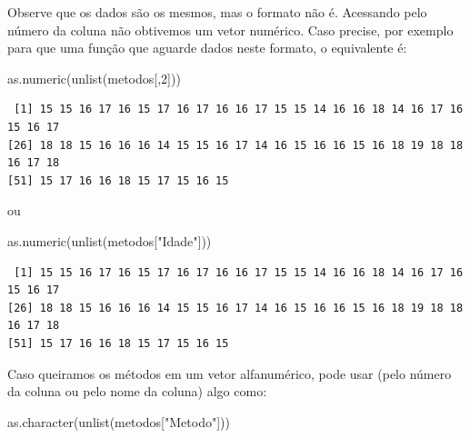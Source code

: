 \documentclass[
]{article}
\newenvironment{Shaded}{\begin{snugshade}}{\end{snugshade}}
\newcommand{\DecValTok}[1]{\textcolor[rgb]{0.00,0.00,0.81}{#1}}
\newcommand{\FunctionTok}[1]{\textcolor[rgb]{0.00,0.00,0.00}{#1}}
\newcommand{\NormalTok}[1]{#1}
\newcommand{\StringTok}[1]{\textcolor[rgb]{0.31,0.60,0.02}{#1}}
\begin{document}
Observe que os dados são os mesmos, mas o formato não é. Acessando pelo
número da coluna não obtivemos um vetor numérico. Caso precise, por
exemplo para que uma função que aguarde dados neste formato, o
equivalente é:

\begin{Shaded}
\begin{Highlighting}[]
\FunctionTok{as.numeric}\NormalTok{(}\FunctionTok{unlist}\NormalTok{(metodos[,}\DecValTok{2}\NormalTok{]))}
\end{Highlighting}
\end{Shaded}

\begin{verbatim}
 [1] 15 15 16 17 16 15 17 16 17 16 16 17 15 15 14 16 16 18 14 16 17 16 15 16 17
[26] 18 18 15 16 16 16 14 15 15 16 17 14 16 15 16 16 15 16 18 19 18 18 16 17 18
[51] 15 17 16 16 18 15 17 15 16 15
\end{verbatim}

ou

\begin{Shaded}
\begin{Highlighting}[]
\FunctionTok{as.numeric}\NormalTok{(}\FunctionTok{unlist}\NormalTok{(metodos[}\StringTok{"Idade"}\NormalTok{]))}
\end{Highlighting}
\end{Shaded}

\begin{verbatim}
 [1] 15 15 16 17 16 15 17 16 17 16 16 17 15 15 14 16 16 18 14 16 17 16 15 16 17
[26] 18 18 15 16 16 16 14 15 15 16 17 14 16 15 16 16 15 16 18 19 18 18 16 17 18
[51] 15 17 16 16 18 15 17 15 16 15
\end{verbatim}

Caso queiramos os métodos em um vetor alfanumérico, pode usar (pelo
número da coluna ou pelo nome da coluna) algo como:

\begin{Shaded}
\begin{Highlighting}[]
\FunctionTok{as.character}\NormalTok{(}\FunctionTok{unlist}\NormalTok{(metodos[}\StringTok{"Metodo"}\NormalTok{]))}
\end{Highlighting}
\end{Shaded}
\end{document}
